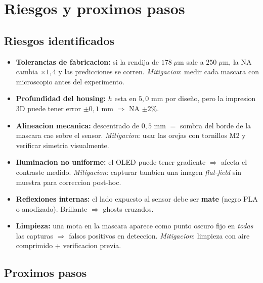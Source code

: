 \documentclass[11pt,a4paper,oneside]{report}
\begin{document}
\chapter{Riesgos y proximos pasos}

\section{Riesgos identificados}

\begin{riesgo}
\begin{itemize}[leftmargin=1.5em]
  \item \textbf{Tolerancias de fabricacion:} si la rendija de $178\;\mu$m sale a $250\;\mu$m,
        la NA cambia $\times 1{,}4$ y las predicciones se corren.
        \emph{Mitigacion}: medir cada mascara con microscopio antes del experimento.
  \item \textbf{Profundidad del housing:} $h$ esta en $5{,}0$ mm por diseño, pero la
        impresion 3D puede tener error $\pm 0{,}1$ mm $\Rightarrow$ NA $\pm 2\%$.
  \item \textbf{Alineacion mecanica:} descentrado de $0{,}5$ mm $=$ sombra del borde de la mascara
        cae sobre el sensor.
        \emph{Mitigacion}: usar las orejas con tornillos M2 y verificar simetria visualmente.
  \item \textbf{Iluminacion no uniforme:} el OLED puede tener gradiente $\Rightarrow$ afecta el
        contraste medido. \emph{Mitigacion}: capturar tambien una imagen \emph{flat-field}
        sin muestra para correccion post-hoc.
  \item \textbf{Reflexiones internas:} el lado expuesto al sensor debe ser \textbf{mate}
        (negro PLA o anodizado). Brillante $\Rightarrow$ ghosts cruzados.
  \item \textbf{Limpieza:} una mota en la mascara aparece como punto oscuro fijo en
        \emph{todas} las capturas $\Rightarrow$ falsos positivos en deteccion.
        \emph{Mitigacion}: limpieza con aire comprimido + verificacion previa.
\end{itemize}
\end{riesgo}

\section{Proximos pasos}
\end{document}
